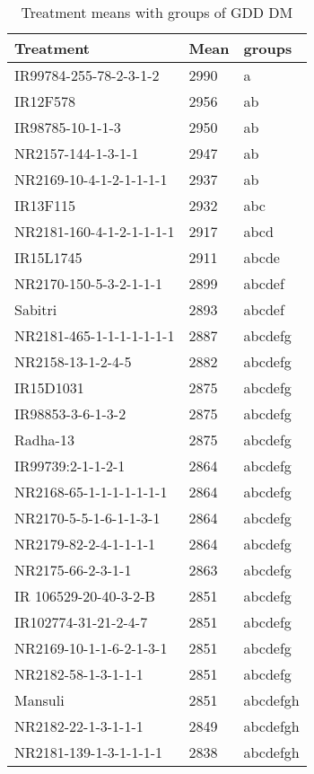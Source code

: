 \documentclass[]{article}
\begin{document}
\begin{longtable}{lll}
\caption{\label{tab:two-fac-groups-tab-agroclimate-normal}Treatment means with groups of GDD DM}\\
\toprule
Treatment & Mean & groups\\
\midrule
\rowcolor{gray!6}  IR99784-255-78-2-3-1-2 & 2990 & a\\
IR12F578 & 2956 & ab\\
\rowcolor{gray!6}  IR98785-10-1-1-3 & 2950 & ab\\
NR2157-144-1-3-1-1 & 2947 & ab\\
\rowcolor{gray!6}  NR2169-10-4-1-2-1-1-1-1 & 2937 & ab\\
\addlinespace
IR13F115 & 2932 & abc\\
\rowcolor{gray!6}  NR2181-160-4-1-2-1-1-1-1 & 2917 & abcd\\
IR15L1745 & 2911 & abcde\\
\rowcolor{gray!6}  NR2170-150-5-3-2-1-1-1 & 2899 & abcdef\\
Sabitri & 2893 & abcdef\\
\addlinespace
\rowcolor{gray!6}  NR2181-465-1-1-1-1-1-1-1 & 2887 & abcdefg\\
NR2158-13-1-2-4-5 & 2882 & abcdefg\\
\rowcolor{gray!6}  IR15D1031 & 2875 & abcdefg\\
IR98853-3-6-1-3-2 & 2875 & abcdefg\\
\rowcolor{gray!6}  Radha-13 & 2875 & abcdefg\\
\addlinespace
IR99739:2-1-1-2-1 & 2864 & abcdefg\\
\rowcolor{gray!6}  NR2168-65-1-1-1-1-1-1-1 & 2864 & abcdefg\\
NR2170-5-5-1-6-1-1-3-1 & 2864 & abcdefg\\
\rowcolor{gray!6}  NR2179-82-2-4-1-1-1-1 & 2864 & abcdefg\\
NR2175-66-2-3-1-1 & 2863 & abcdefg\\
\addlinespace
\rowcolor{gray!6}  IR 106529-20-40-3-2-B & 2851 & abcdefg\\
IR102774-31-21-2-4-7 & 2851 & abcdefg\\
\rowcolor{gray!6}  NR2169-10-1-1-6-2-1-3-1 & 2851 & abcdefg\\
NR2182-58-1-3-1-1-1 & 2851 & abcdefg\\
\rowcolor{gray!6}  Mansuli & 2851 & abcdefgh\\
\addlinespace
NR2182-22-1-3-1-1-1 & 2849 & abcdefgh\\
\rowcolor{gray!6}  NR2181-139-1-3-1-1-1-1 & 2838 & abcdefgh\\

\end{longtable}
\end{document}
